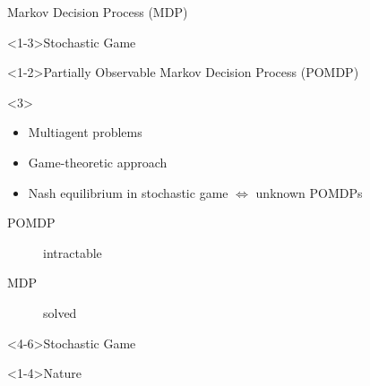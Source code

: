 \begin{frame}{Markov Decision Process (MDP)}
\end{frame}
\begin{frame}<1-3>{Stochastic Game}
\end{frame}
\begin{frame}<1-2>{Partially Observable Markov Decision Process (POMDP)}
\end{frame}
\begin{frame}<3>
\end{frame}
\recap
\begin{frame}
\begin{itemize}
\item Multiagent problems
\item Game-theoretic approach
\item Nash equilibrium in stochastic game \(\iff\) unknown POMDPs
\end{itemize}

\bigskip\bigskip
\pause

\begin{description}
\item[POMDP] intractable
\item[MDP] solved
\end{description}
\end{frame}
\begin{frame}<4-6>{Stochastic Game}
\end{frame}
\begin{frame}<1-4>{Nature}
\end{frame}
